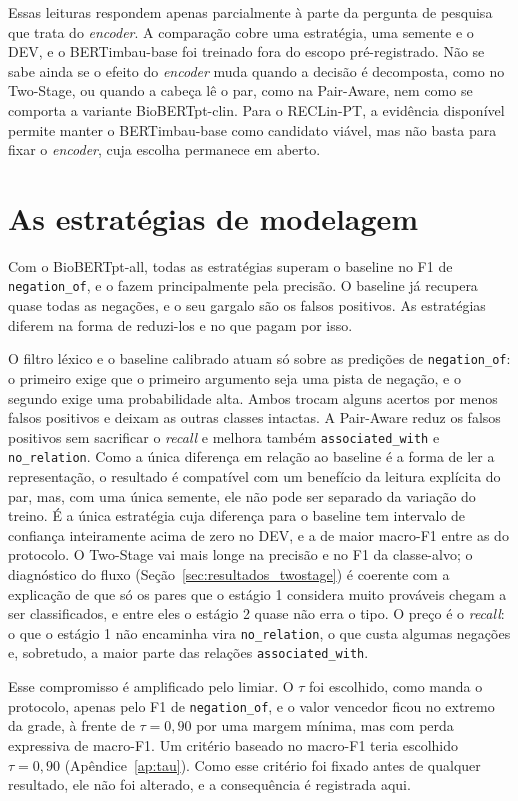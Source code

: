 Essas leituras respondem apenas parcialmente à parte da pergunta de pesquisa que
trata do \emph{encoder}. A
comparação cobre uma estratégia, uma semente e o DEV, e o BERTimbau-base foi treinado
fora do escopo pré-registrado. Não se sabe ainda se o efeito do \emph{encoder} muda
quando a decisão é decomposta, como no Two-Stage, ou quando a cabeça lê o par, como
na Pair-Aware, nem como se comporta a variante BioBERTpt-clin. Para o RECLin-PT,
a evidência disponível permite manter o BERTimbau-base como candidato viável, mas
não basta para fixar o \emph{encoder}, cuja escolha permanece em aberto.

\section{As estratégias de modelagem}
\label{sec:discussao_estrategias}

Com o BioBERTpt-all, todas as estratégias superam o baseline no F1 de
\texttt{negation\_of}, e o fazem principalmente pela precisão. O baseline já
recupera quase todas as negações, e o seu gargalo são os falsos positivos. As
estratégias diferem na forma de reduzi-los e no que pagam por isso.

O filtro léxico e o baseline calibrado atuam só sobre as predições
de \texttt{negation\_of}: o primeiro exige que o primeiro argumento seja uma pista de
negação, e o segundo exige uma probabilidade alta. Ambos trocam alguns acertos por
menos falsos positivos e deixam as outras classes intactas. A Pair-Aware
reduz os falsos positivos sem sacrificar o \emph{recall} e melhora também
\texttt{associated\_with} e \texttt{no\_relation}. Como a única diferença em
relação ao baseline é a forma de ler a representação, o resultado é compatível com um
benefício da leitura explícita do par, mas, com uma única semente, ele não pode ser
separado da variação do treino. É a única estratégia cuja diferença para o baseline
tem intervalo de confiança inteiramente acima de zero no DEV, e a de maior macro-F1
entre as do protocolo. O Two-Stage vai
mais longe na precisão e no F1 da classe-alvo; o diagnóstico do fluxo
(Seção~\ref{sec:resultados_twostage}) é coerente com a explicação de que só os pares
que o estágio 1 considera muito prováveis chegam a ser classificados, e entre eles o
estágio 2 quase não erra o tipo. O preço é o \emph{recall}: o que o estágio 1 não encaminha
vira \texttt{no\_relation}, o que custa algumas negações e, sobretudo, a maior parte
das relações \texttt{associated\_with}.

Esse compromisso é amplificado pelo limiar. O $\tau$ foi escolhido, como manda o
protocolo, apenas pelo F1 de \texttt{negation\_of}, e o valor vencedor ficou no
extremo da grade, à frente de $\tau=0{,}90$ por uma margem mínima, mas com perda
expressiva de macro-F1. Um critério baseado no macro-F1 teria escolhido
$\tau=0{,}90$ (Apêndice~\ref{ap:tau}). Como esse critério foi fixado antes de qualquer resultado, ele não foi
alterado, e a consequência é registrada aqui.

